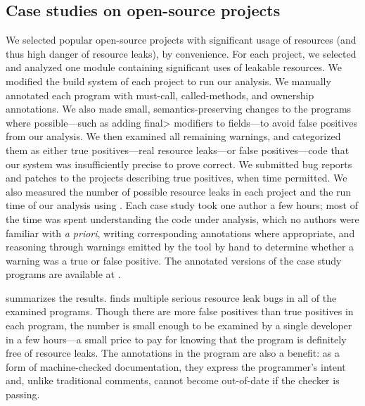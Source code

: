 \subsection{Case studies on open-source projects}
\label{sec:case-studies}

We selected  popular open-source projects with significant
usage of resources (and thus high danger of resource leaks), by
convenience.
For each project, we selected and analyzed one module
containing significant uses of leakable resources.
We modified the build system of each project to run our
analysis. We manually annotated each program with must-call,
called-methods, and ownership annotations. We also
made small, semantics-preserving changes to the programs where
possible---such as adding
\<final> modifiers to fields---to avoid
false positives from our analysis. We then examined all
remaining warnings, and categorized them as either true
positives---real resource leaks---or false positives---code that our
system was insufficiently precise to prove correct. We submitted bug
reports and patches to the projects describing true positives, when time permitted.
We also measured the number of possible resource leaks in each project
and the run time of our analysis using . Each case study took one author a few hours;
most of the time was spent understanding the code under analysis, which no
authors were familiar with \emph{a priori}, writing corresponding annotations
where appropriate, and reasoning through warnings emitted by the tool by hand
to determine whether a warning was a true or false positive.
The annotated versions of the case study programs are available at
.

 summarizes the results. \tool finds multiple
serious resource leak bugs in all of the examined programs. Though
there are more false positives than true positives in each program,
the number is small enough to be examined by a single developer in a
few hours---a small price to pay for knowing that the program is
definitely free of resource leaks.  The annotations in the program are
also a benefit: as a form of machine-checked documentation, they
express the programmer's intent and, unlike traditional comments,
cannot become out-of-date if the checker is passing.



